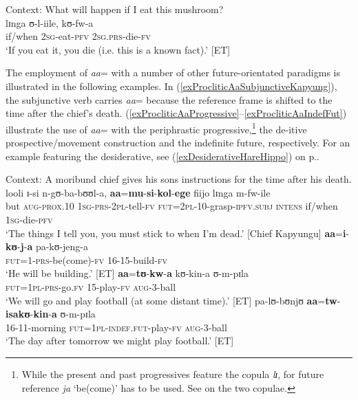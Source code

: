 \begin{exe}
\ex
\label{exPRSFuturateVsProclitic}
Context: What will happen if I eat this mushroom?\\
\gll lɪnga ʊ-l-iile, kʊ-fw-a\\
if/when \textsc{2sg}-eat-\textsc{pfv} \textsc{2sg.prs}-die-\textsc{fv}\\
\glt \lq If you eat it, you die (i.e. this is a known fact).' [ET]
\end{exe}

The employment of \textit{aa}= with a number of other future-orientated paradigms is illustrated in the following examples. In (\ref{exProcliticAaSubjunctiveKapyung}), the subjunctive verb carries \textit{aa}= because the reference frame is shifted to the time after the chief's death. (\ref{exProcliticAaProgressive}--\ref{exProcliticAaIndefFut}) illustrate the use of \textit{aa}= with the periphrastic progressive,\footnote{While the present and past progressives feature the copula \textit{lɪ}, for future reference \textit{ja} \lq be(come)' has to be used. See  on the two copulae.} the de-itive prospective/movement construction and the indefinite future, respectively. For an example featuring the desiderative, see (\ref{exDesiderativeHareHippo}) on p.\nobreakspace\pageref{exDesiderativeHareHippo}.
\begin{exe}
\ex \label{exProcliticAaSubjunctiveKapyung}
Context: A moribund chief gives his sons instructions for the time after his death.\\
 \gll looli ɪ-si n-gʊ-ba-bʊʊl-a, \textbf{aa}=\textbf{mu}-\textbf{si}-\textbf{kol}-\textbf{ege} fiijo lɪnga m-fw-ile\\
but \textsc{aug}-\textsc{prox.10} \textsc{1sg}-\textsc{prs}-\textsc{2pl}-tell-\textsc{fv} \textsc{fut}=\textsc{2pl}-10-grasp-\textsc{ipfv.subj} \textsc{intens} if/when \textsc{1sg}-die-\textsc{pfv}\\
\glt `The things I tell you, you must stick to when I'm dead.' [Chief Kapyungu]
\ex \label{exProcliticAaProgressive} \gll \textbf{aa}=\textbf{i}-\textbf{kʊ}-\textbf{j}-\textbf{a} pa-kʊ-jeng-a\\
\textsc{fut}=1-\textsc{prs}-be(come)-\textsc{fv} 16-15-build-\textsc{fv}\\
\glt \lq He will be building.' [ET]
\ex \gll \textbf{aa}=\textbf{tʊ}-\textbf{kw}-\textbf{a} kʊ-kin-a ʊ-m-pɪla\\
\textsc{fut}=\textsc{1pl}-\textsc{prs}-go.\textsc{fv} 15-play-\textsc{fv} \textsc{aug}-3-ball\\
\glt \lq We will go and play football (at some distant time).' [ET]
\ex  \label{exProcliticAaIndefFut} \gll pa-lʊ-bʊnjʊ \textbf{aa}=\textbf{tw}-\textbf{isakʊ}-\textbf{kin}-\textbf{a} ʊ-m-pɪla\\
16-11-morning \textsc{fut}=\textsc{1pl}-\textsc{indef.fut}-play-\textsc{fv} \textsc{aug}-3-ball\\
\glt \lq The day after tomorrow we might play football.' [ET]
\end{exe}

